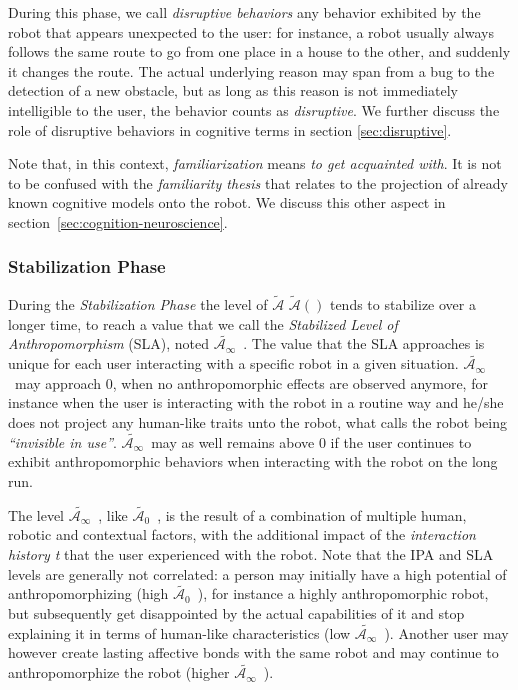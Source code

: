 \documentclass{frontiersSCNS} %
\newcommand{\AntE}[1][]{%
      \ifthenelse{\isempty{#1}}%
      {$\widetilde{\mathcal{A}}$}
      {$\widetilde{\mathcal{A}}(#1)$}
}
\newcommand{\IPAe}{{$\widetilde{\mathcal{A}_0}$~}}
\newcommand{\SLAe}{{$\widetilde{\mathcal{A}_\infty}$~}}
\begin{document}
During this phase, we call \emph{disruptive behaviors} any behavior exhibited by
the robot that appears unexpected to the user: for instance, a robot usually
always follows the same route to go from one place in a house to the other, and
suddenly it changes the route. The actual underlying reason may span from a
bug to the detection of a new obstacle, but as long as this reason is not
immediately intelligible to the user, the behavior counts as \emph{disruptive}.
We further discuss the role of disruptive behaviors in cognitive terms in
section \ref{sec:disruptive}.

Note that, in this context, \emph{familiarization} means \emph{to get acquainted with}.
It is not to be confused with the \emph{familiarity thesis} that relates to the
projection of already known cognitive models onto the robot. We discuss this other
aspect in section~\ref{sec:cognition-neuroscience}.

\subsubsection{Stabilization Phase\\}

During the \textit{Stabilization Phase} the level of \AntE tends to stabilize over
a longer time, to reach a value that we call the \textit{Stabilized Level of
Anthropomorphism} (SLA), noted \SLAe. The value that the
SLA approaches is unique for each user interacting with a specific robot in a
given situation. \SLAe may approach $0$, when no anthropomorphic effects
are observed anymore, for instance when the user is interacting with the robot
in a routine way and he/she does not project any human-like traits unto the
robot, what \cite{takayama_toward_2011} calls the robot being
\textit{``invisible in use''}. \SLAe may as well remains above 0 if the user
continues to exhibit anthropomorphic behaviors when interacting with the robot
on the long run.

The level \SLAe, like \IPAe, is the result of a combination of multiple human,
robotic and contextual factors, with the additional impact of the
\emph{interaction history t} that the user experienced with the robot. Note that
the IPA and SLA levels are generally not correlated: a person may initially
have a high potential of anthropomorphizing (high \IPAe), for instance a highly
anthropomorphic robot, but subsequently get disappointed by the actual
capabilities of it and stop explaining it in terms of human-like characteristics
(low \SLAe). Another user may however create lasting affective bonds with the
same robot and may continue to anthropomorphize the robot (higher \SLAe).
\end{document}
